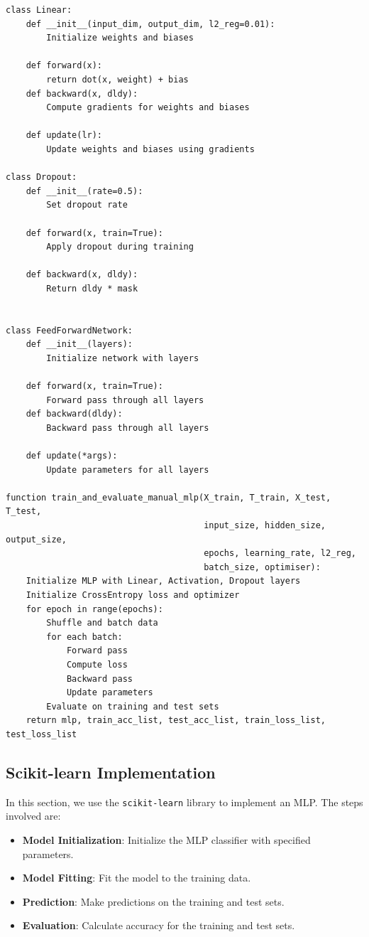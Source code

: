 \documentclass[a4paper,12pt]{article}
\begin{document}
\begin{verbatim}
class Linear:
    def __init__(input_dim, output_dim, l2_reg=0.01):
        Initialize weights and biases

    def forward(x):
        return dot(x, weight) + bias
    def backward(x, dldy):
        Compute gradients for weights and biases

    def update(lr):
        Update weights and biases using gradients

class Dropout:
    def __init__(rate=0.5):
        Set dropout rate

    def forward(x, train=True):
        Apply dropout during training

    def backward(x, dldy):
        Return dldy * mask


class FeedForwardNetwork:
    def __init__(layers):
        Initialize network with layers

    def forward(x, train=True):
        Forward pass through all layers
    def backward(dldy):
        Backward pass through all layers

    def update(*args):
        Update parameters for all layers

function train_and_evaluate_manual_mlp(X_train, T_train, X_test, T_test, 
                                       input_size, hidden_size, output_size,
                                       epochs, learning_rate, l2_reg,
                                       batch_size, optimiser):
    Initialize MLP with Linear, Activation, Dropout layers
    Initialize CrossEntropy loss and optimizer
    for epoch in range(epochs):
        Shuffle and batch data
        for each batch:
            Forward pass
            Compute loss
            Backward pass
            Update parameters
        Evaluate on training and test sets
    return mlp, train_acc_list, test_acc_list, train_loss_list, test_loss_list
\end{verbatim}

\subsection{Scikit-learn Implementation}
In this section, we use the \texttt{scikit-learn} library to implement an MLP. The steps involved are:

\begin{itemize}
    \item \textbf{Model Initialization}: Initialize the MLP classifier with specified parameters.
    \item \textbf{Model Fitting}: Fit the model to the training data.
    \item \textbf{Prediction}: Make predictions on the training and test sets.
    \item \textbf{Evaluation}: Calculate accuracy for the training and test sets.
\end{itemize}
\end{document}
